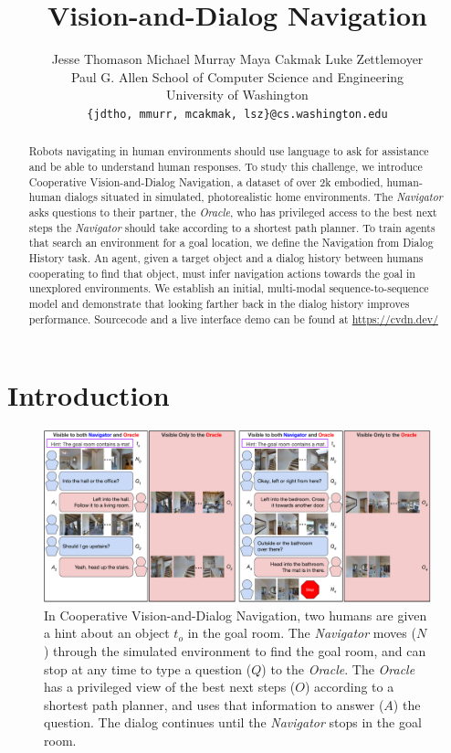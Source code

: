 \documentclass{article}
\title{Vision-and-Dialog Navigation}
\author{
  Jesse Thomason \qquad Michael Murray \qquad Maya Cakmak \qquad Luke Zettlemoyer \\
  Paul G. Allen School of Computer Science and Engineering \\
  University of Washington \\
  \texttt{\{jdtho, mmurr, mcakmak, lsz\}@cs.washington.edu}
}
\newcommand{\datasetfull}{Cooperative Vision-and-Dialog Navigation}
\newcommand{\taskfull}{Navigation from Dialog History}
\newcommand{\nav}{\textit{Navigator}}
\newcommand{\ora}{\textit{Oracle}}
\begin{document}
\maketitle


\begin{abstract}
Robots navigating in human environments should use language to ask for assistance and be able to understand human responses.
To study this challenge, we introduce \datasetfull{}, a dataset of over 2k embodied, human-human dialogs situated in simulated, photorealistic home environments.
The \nav{} asks questions to their partner, the \ora{}, who has privileged access to the best next steps the \nav{} should take according to a shortest path planner.
To train agents that search an environment for a goal location, we define the \taskfull{} task.
An agent, given a target object and a dialog history between humans cooperating to find that object, must infer navigation actions towards the goal in unexplored environments.
We establish an initial, multi-modal sequence-to-sequence model and demonstrate that looking farther back in the dialog history improves performance.
Sourcecode and a live interface demo can be found at \url{https://cvdn.dev/}
\end{abstract}


\section{Introduction}
\label{sec:introduction}


\begin{figure}[ht]
\centering
\includegraphics[width=1.\columnwidth]{figures/full_demo.pdf}
\caption{In \datasetfull{}, two humans are given a hint about an object $t_o$ in the goal room.
The \nav{} moves ($N$) through the simulated environment to find the goal room, and can stop at any time to type a question ($Q$) to the \ora.
The \ora{} has a privileged view of the best next steps ($O$) according to a shortest path planner, and uses that information to answer ($A$) the question.
The dialog continues until the \nav{} stops in the goal room.}
\vspace{-4mm}
\label{fig:full_demo}
\end{figure}
\end{document}
